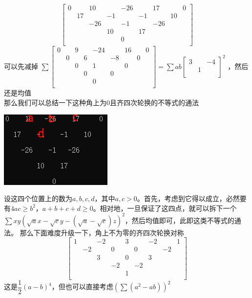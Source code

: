 \documentclass[UTF8]{ctexart}
\begin{document}
\renewcommand*{\arraystretch}{1.732}\[
\left[\begin{matrix}
	0& &10& &-26& &17& &0\\
	&17& &-1& &-1& &10&\\
	& &-26& &-1& &-26& &\\
	& & &10& &17& & &\\
	& & & &0& & & &\\
\end{matrix}\right]
\]
可以先减掉
$\displaystyle \sum 
\left[\begin{matrix}
	0& &9& &-24& &16& &0\\
	&0& &6& &-8& &0&\\
	& &0& &1& &0& &\\
	& & &0& &0& & &\\
	& & & &0& & & &\\
\end{matrix}\right]
=\displaystyle \sum ab
\left[\begin{matrix}
	3& &-4 \\
	& 1&\\
\end{matrix}\right]^{2} $
，然后还是均值\\
那么我们可以总结一下这种角上为0且齐四次轮换的不等式的通法
\begin{center}
	\includegraphics[width=0.3\linewidth]{27}
\end{center}
设这四个位置上的数为$ a,b,c,d $，其中$ a,c> 0 $。首先，考虑到它得以成立，必然要有$ 4ac≥b^{2} $，$ a+b+c+d\geq 0 $。相对地，一旦保证了这四点，就可以拆下一个\\
$ \displaystyle \sum xy(\sqrt{a}x-\sqrt{c}y-(\sqrt{a}-\sqrt{c})z)^{2} $，然后均值即可，此即这类不等式的通法。
那么下面难度升级一下，角上不为零的齐四次轮换对称
\renewcommand*{\arraystretch}{1.732}\[
\left[\begin{matrix}
	1& &-2& &3& &-2& &1\\
	&-2& &0& &0& &-2&\\
	& &3& &0& &3& &\\
	& & &-2& &-2& & &\\
	& & & &1& & & &\\
\end{matrix}\right]
\]
这是$ \dfrac{1}{2}(a-b)^{4} $，但也可以直接考虑$ (\displaystyle \sum (a^{2}-ab))^{2} $
\end{document}
